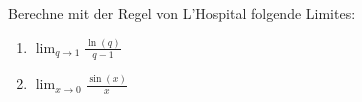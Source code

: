 \begin{exercise} %
  Berechne mit der Regel von L'Hospital folgende Limites:
  \begin{enumerate}[label=(\alph*)]
  \item $\displaystyle \lim_{q \to 1} \frac{\ln(q)}{q-1}$
  \item $\displaystyle \lim_{x \to 0} \frac{\sin(x)}{x}$
  \end{enumerate}
\end{exercise}
